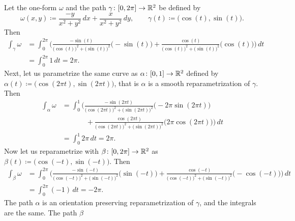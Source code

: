 \begin{example} \label{example:mv:irrotoneformint}
Let the one-form $\omega$ and the path $\gamma \colon [0,2\pi] \to {\mathbb{R}}^2$ be defined by
\begin{equation*}
\omega(x,y) \coloneqq \frac{-y}{x^2+y^2} \,dx + \frac{x}{x^2+y^2} \,dy,
\qquad
\gamma(t) \coloneqq \bigl(\cos(t),\sin(t)\bigr) .
\end{equation*}
Then
\begin{equation*}
\begin{split}
\int_{\gamma} \omega
& =
\int_0^{2\pi}
\Biggl(
\frac{-\sin(t)}{{\bigl(\cos(t)\bigr)}^2+{\bigl(\sin(t)\bigr)}^2}
\bigl(-\sin(t)\bigr)
+
\frac{\cos(t)}{{\bigl(\cos(t)\bigr)}^2+{\bigl(\sin(t)\bigr)}^2}
\bigl(\cos(t)\bigr)
\Biggr) \, dt
\\
& =
\int_0^{2\pi}
1 \, dt
= 2\pi .
\end{split}
\end{equation*}
Next, let us parametrize the same curve as
$\alpha \colon [0,1] \to {\mathbb{R}}^2$ defined by $\alpha(t) \coloneqq \bigl(\cos(2\pi
t),\sin(2 \pi t)\bigr)$, that is $\alpha$ is a smooth reparametrization of
$\gamma$.  Then
\begin{equation*}
\begin{split}
\int_{\alpha} \omega
& =
\int_0^{1}
\Biggl(
\frac{-\sin(2\pi t)}{{\bigl(\cos(2\pi t)\bigr)}^2+{\bigl(\sin(2\pi t)\bigr)}^2}
\bigl(-2\pi \sin(2\pi t)\bigr)
\\
& \phantom{=\int_0^1\Biggl(~}
+
\frac{\cos(2 \pi t)}{{\bigl(\cos(2 \pi t)\bigr)}^2+{\bigl(\sin(2 \pi t)\bigr)}^2}
\bigl(2 \pi \cos(2 \pi t)\bigr)
\Biggr) \, dt
\\
& =
\int_0^{1}
2\pi \, dt
= 2\pi .
\end{split}
\end{equation*}
Now let us reparametrize with $\beta \colon [0,2\pi] \to {\mathbb{R}}^2$
as $\beta(t) \coloneqq \bigl(\cos(-t),\sin(-t)\bigr)$.  Then
\begin{equation*}
\begin{split}
\int_{\beta} \omega
& =
\int_0^{2\pi}
\Biggl(
\frac{-\sin(-t)}{{\bigl(\cos(-t)\bigr)}^2+{\bigl(\sin(-t)\bigr)}^2}
\bigl(\sin(-t)\bigr)
+
\frac{\cos(-t)}{{\bigl(\cos(-t)\bigr)}^2+{\bigl(\sin(-t)\bigr)}^2}
\bigl(-\cos(-t)\bigr)
\Biggr) \, dt
\\
& =
\int_0^{2\pi}
(-1) \, dt
= -2\pi .
\end{split}
\end{equation*}
The path $\alpha$ is an orientation preserving reparametrization of
$\gamma$, and the integrals are the same.  The path $\beta$

\end{example}
